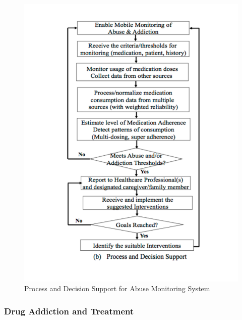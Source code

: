 \documentclass[sigconf]{acmart}
\begin{document}
\begin{figure}[!ht]
  \centering\includegraphics[width=\columnwidth]{images/Figure1.pdf}
  \caption{Process and Decision Support for Abuse Monitoring System 
  \cite{Varshney14}
  }\label{f:Figure1}
\end{figure}

\subsubsection{Drug Addiction and Treatment}
\end{document}
